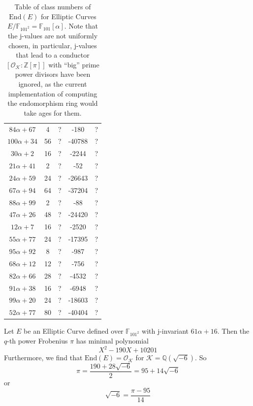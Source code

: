 \documentclass{scrartcl}
\newcommand{\Z}{\mathbb{Z}}
\newcommand{\F}{\mathbb{F}}
\newcommand{\End}{\mathrm{End}}
\newcommand{\K}{\mathcal{K}}
\renewcommand{\O}{\mathcal{O}}
\theoremstyle{definition}
\begin{document}
\begin{table}
\begin{center}
\begin{tabular}{c c c c c}
            $84\alpha + 67$ & 4 & ? & -180 & ? \\
            $100\alpha + 34$ & 56 & ? & -40788 & ? \\
            $30\alpha + 2$ & 16 & ? & -2244 & ? \\
            $21\alpha + 41$ & 2 & ? & -52 & ? \\
            $24\alpha + 59$ & 24 & ? & -26643 & ? \\
            $67\alpha + 94$ & 64 & ? & -37204 & ? \\
            $88\alpha + 99$ & 2 & ? & -88 & ? \\
            $47\alpha + 26$ & 48 & ? & -24420 & ? \\
            $12\alpha + 7$ & 16 & ? & -2520 & ? \\
            $55\alpha + 77$ & 24 & ? & -17395 & ? \\
            $95\alpha + 92$ & 8 & ? & -987 & ? \\
            $68\alpha + 12$ & 12 & ? & -756 & ? \\
            $82\alpha + 66$ & 28 & ? & -4532 & ? \\
            $91\alpha + 38$ & 16 & ? & -6948 & ? \\
            $99\alpha + 20$ & 24 & ? & -18603 & ? \\
            $52\alpha + 77$ & 80 & ? & -40404 & ? 
        \end{tabular}
    \end{center}
    \caption{\label{tab:class_numbers_of_endo_rings} Table of class numbers of $\End(E)$ for Elliptic Curves $E/\F_{101^2} = \F_{101}[\alpha]$. 
    Note that the j-values are not uniformly chosen, in particular, j-values that lead to a conductor $[\O_\K : \Z[\pi]]$ with ``big'' prime power divisors have been ignored, as the current implementation of computing the endomorphism ring would take ages for them.}
\end{table}
Let $E$ be an Elliptic Curve defined over $\F_{101^2}$ with j-invariant $61\alpha + 16$.
Then the $q$-th power Frobenius $\pi$ has minimal polynomial
\begin{equation*}
    X^2 - 190 X + 10201
\end{equation*}
Furthermore, we find that $\End(E) = \O_\K$ for $\K = \mathbb{Q}(\sqrt{-6})$.
So
\begin{equation*}
    \pi = \frac {190 + 28\sqrt{-6}} 2 = 95 + 14\sqrt{-6}
\end{equation*}
or
\begin{equation*}
    \sqrt{-6} = \frac {\pi - 95} {14}
\end{equation*}
\end{document}
